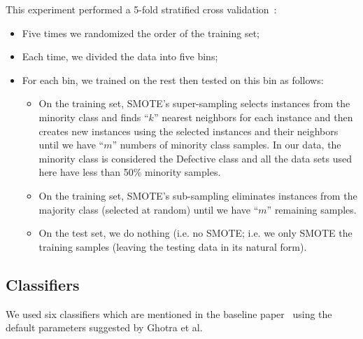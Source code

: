 \documentclass[sigconf,review, anonymous]{acmart}
\newcommand{\bi}{\begin{itemize}[leftmargin=0.4cm]}
\newcommand{\ei}{\end{itemize}}
\theoremstyle{break}
\theoremstyle{break}
\begin{document}
This experiment performed a 5-fold stratified cross validation~\cite{refaeilzadeh2009cross}:
\bi
\item Five times we randomized the order of the training set;
\item Each time, we divided the data into five bins;
\item For each bin, we trained on the rest then tested
on this bin as follows:
\bi
\item
On the training set, SMOTE's super-sampling selects instances from the minority class and finds ``$k$'' nearest neighbors for each instance and then creates new instances using the selected instances and their neighbors until we have ``$m$'' numbers of minority class samples. 
In our data, 
 the minority class is considered the Defective class and all the data sets used here have less than 50\% minority samples.
\item
On the training set, SMOTE's sub-sampling  eliminates instances from the majority class (selected at random)
until we have ``$m$'' remaining samples.
 
\item On the test set, we do nothing (i.e. no SMOTE;
i.e. we only SMOTE the training samples
(leaving the  testing data in its natural form).
\ei
\ei

\subsection{\textbf{Classifiers}}
\label{sect:classes}

We used six classifiers which are mentioned in the baseline paper~\cite{ghotra2015revisiting}
using the default
parameters  suggested by Ghotra et al.
\end{document}
